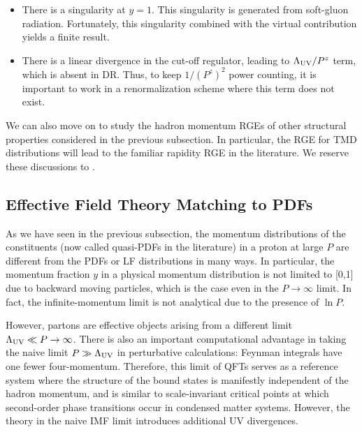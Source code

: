 \begin{itemize}
	\item{There is a singularity at $y=1$. This singularity is generated
		from soft-gluon radiation. Fortunately, this singularity combined
		with the virtual contribution yields a finite result.}
	
	\item{There is a linear divergence in the cut-off regulator,
		leading to $\Lambda_{\rm UV}/P^z$ term, which is absent in DR. Thus, to keep $1/(P^z)^2$
		power counting, it is important
		to work in a renormalization scheme where this term does not exist.}
	
\end{itemize}

We can also move on to study the hadron momentum RGEs of other
structural properties considered in the previous subsection.
In particular, the RGE for TMD distributions will lead to
the familiar rapidity RGE in the literature. We reserve these discussions to .

\subsection{Effective Field Theory Matching to PDFs}
\label{sec:lamet-fact}
As we have seen in the previous subsection,
the momentum distributions of the constituents (now
called quasi-PDFs in the literature) in a proton at large $P$
are different from the PDFs or LF distributions in many ways.
In particular, the momentum fraction $y$ in a physical momentum distribution
is not limited to [0,1] due to backward moving particles,
which is the case even in the $P\to\infty$ limit. In fact, the
infinite-momentum limit is not analytical due to the presence of $\ln P$.

However, partons are effective objects arising
from a different limit $\Lambda_{\rm UV}\ll P\to \infty $.
There is also an important computational advantage in taking the naive limit $P\gg \Lambda_{\rm UV}$ in
perturbative calculations: Feynman integrals have one fewer four-momentum.
Therefore, this limit of QFTs serves as a
reference system where the structure of the bound states
is manifestly {independent of the hadron momentum}, and is similar to
scale-invariant critical points at which second-order phase transitions occur
in condensed matter systems. However, the theory in the naive IMF limit
introduces additional UV divergences.

